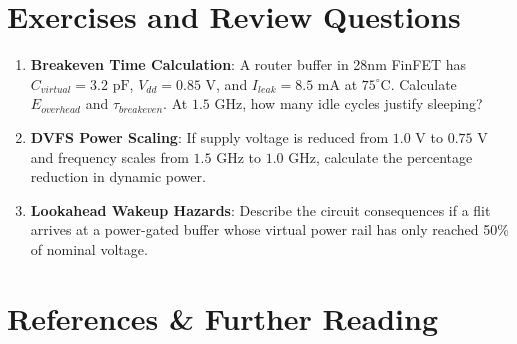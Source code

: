 \section{Exercises and Review Questions}
\label{sec:ch6_exercises}

\begin{enumerate}
    \item \textbf{Breakeven Time Calculation}: A router buffer in 28nm FinFET has $C_{virtual} = 3.2\text{ pF}$, $V_{dd} = 0.85\text{ V}$, and $I_{leak} = 8.5\text{ mA}$ at $75^\circ\text{C}$. Calculate $E_{overhead}$ and $\tau_{breakeven}$. At $1.5\text{ GHz}$, how many idle cycles justify sleeping?
    \item \textbf{DVFS Power Scaling}: If supply voltage is reduced from $1.0\text{ V}$ to $0.75\text{ V}$ and frequency scales from $1.5\text{ GHz}$ to $1.0\text{ GHz}$, calculate the percentage reduction in dynamic power.
    \item \textbf{Lookahead Wakeup Hazards}: Describe the circuit consequences if a flit arrives at a power-gated buffer whose virtual power rail has only reached 50\% of nominal voltage.
\end{enumerate}

\section{References \& Further Reading}
\label{sec:ch6_references}

